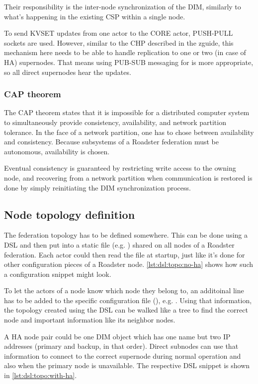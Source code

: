 Their responsibility is the inter-node synchronization of the DIM, similarly to
what's happening in the existing CSP within a single node.

To send KVSET updates from one actor to the CORE actor, PUSH-PULL sockets are
used. However, similar to the \gls{CHP} described in the \gls{zguide}, this
mechanism here needs to be able to handle replication to one or two (in case of
HA) supernodes. That means using PUB-SUB messaging for is more
appropriate, so all direct supernodes hear the updates.

\subsubsection{CAP theorem}
The CAP theorem \cite{wp:cap} states that it is impossible for a distributed
computer system to simultaneously provide consistency, availability, and
network partition tolerance. In the face of a network partition, one has to
chose between availability and consistency. Because subsystems of a Roadster
federation must be autonomous, availability is chosen.

Eventual consistency is guaranteed by restricting write access to the owning
node, and recovering from a network partition when communication is restored is
done by simply reinitiating the DIM synchronization process.

\subsection{Node topology definition}
The federation topology has to be defined somewhere. This can be done using a
\gls{DSL} and then put into a static file (e.g. ) shared
on all nodes of a Roadster federation. Each actor could then read the file at
startup, just like it's done for other configuration pieces of a Roadster node.
\autoref{lst:dsl:topo:no-ha} shows how such a configuration snippet might look.

To let the actors of a node know which node they belong to, an additoinal line
has to be added to the specific configuration file (), e.g.
. Using that information, the topology
created using the DSL can be walked like a tree to find the correct node and
important information like its neighbor nodes.

A HA node pair could be one DIM object which has one name but two IP addresses
(primary and backup, in that order). Direct subnodes can use that information
to connect to the correct supernode during normal operation and also
when the primary node is unavailable. The respective DSL snippet is shown in
\autoref{lst:dsl:topo:with-ha}.

